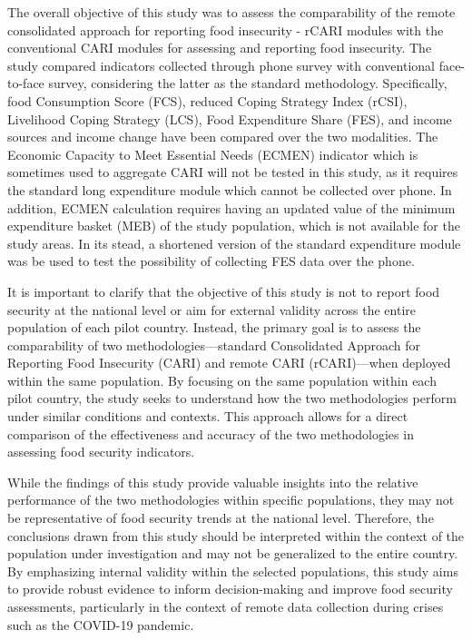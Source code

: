 \documentclass[11pt,harvard]{article}
\begin{document}
The overall objective of this study was to assess the comparability of the remote consolidated approach for reporting food insecurity - rCARI modules with the conventional CARI modules for assessing and reporting food insecurity. The study compared indicators collected through phone survey with conventional face-to-face survey, considering the latter as the standard methodology. Specifically, food Consumption Score (FCS), reduced Coping Strategy Index (rCSI), Livelihood Coping Strategy (LCS), Food Expenditure Share (FES), and income sources and income change have been compared over the two modalities. The Economic Capacity to Meet Essential Needs (ECMEN) indicator which is sometimes used to aggregate CARI will not be tested in this study, as it requires the standard long expenditure module which cannot be collected over phone. In addition, ECMEN calculation requires having an updated value of the minimum expenditure basket (MEB) of the study population, which is not available for the study areas. In its stead, a shortened version of the standard expenditure module was be used to test the possibility of collecting FES data over the phone.

It is important to clarify that the objective of this study is not to report food security at the national level or aim for external validity across the entire population of each pilot country. Instead, the primary goal is to assess the comparability of two methodologies—standard Consolidated Approach for Reporting Food Insecurity (CARI) and remote CARI (rCARI)—when deployed within the same population. By focusing on the same population within each pilot country, the study seeks to understand how the two methodologies perform under similar conditions and contexts. This approach allows for a direct comparison of the effectiveness and accuracy of the two methodologies in assessing food security indicators.

While the findings of this study provide valuable insights into the relative performance of the two methodologies within specific populations, they may not be representative of food security trends at the national level. Therefore, the conclusions drawn from this study should be interpreted within the context of the population under investigation and may not be generalized to the entire country. By emphasizing internal validity within the selected populations, this study aims to provide robust evidence to inform decision-making and improve food security assessments, particularly in the context of remote data collection during crises such as the COVID-19 pandemic.
\end{document}
